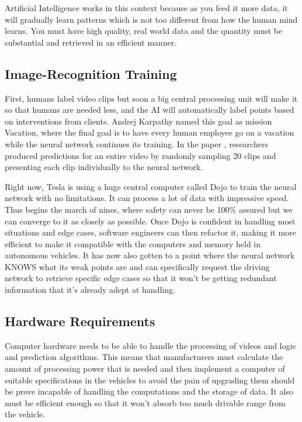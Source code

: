 \documentclass{article}
\begin{document}
Artificial Intelligence works in this context because as you feed it more data, it will gradually learn patterns which is not too different from how the human mind learns. You must have high quality, real world data and the quantity must be substantial and retrieved in an efficient manner.  

\subsection{Image-Recognition Training}

First, humans label video clips but soon a big central processing unit will make it so that humans are needed less, and the AI will automatically label points based on interventions from clients. Andrej Karpathy named this goal as mission Vacation, where the final goal is to have every human employee go on a vacation while the neural network continues its training. In the paper \cite{karpathy2014large}, researchers produced predictions for an entire video by randomly sampling 20 clips and presenting each clip individually to the neural network.

Right now, Tesla is using a huge central computer called Dojo to train the neural network with no limitations. It can process a lot of data with impressive speed. Thus begins the march of nines, where safety can never be 100\% assured but we can converge to it as closely as possible. Once Dojo is confident in handling most situations and edge cases, software engineers can then refactor it, making it more efficient to make it compatible with the computers and memory held in autonomous vehicles. It has now also gotten to a point where the neural network KNOWS what its weak points are and can specifically request the driving network to retrieve specific edge cases so that it won’t be getting redundant information that it’s already adept at handling. 

\subsection{Hardware Requirements}

Computer hardware needs to be able to handle the processing of videos and logic and prediction algorithms. This means that manufacturers must calculate the amount of processing power that is needed and then implement a computer of suitable specifications in the vehicles to avoid the pain of upgrading them should be prove incapable of handling the computations and the storage of data. It also must be efficient enough so that it won’t absorb too much drivable range from the vehicle. 
\end{document}
